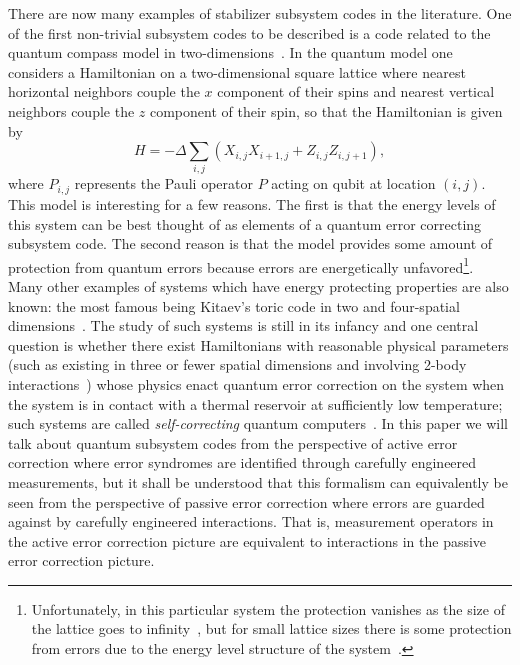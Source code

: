 \documentclass{amsbook}
\theoremstyle{plain}
\theoremstyle{definition}
\theoremstyle{remark}
\begin{document}
There are now many examples of stabilizer subsystem codes in the literature.  One of the first non-trivial subsystem codes to be described is a code related to the quantum compass model in two-dimensions~\cite{Bacon:01a,Dorier:05a,Bacon:06a}.  In the quantum model one considers a Hamiltonian on a two-dimensional square lattice where nearest horizontal neighbors couple the $x$ component of their spins and nearest vertical neighbors couple the $z$ component of their spin, so that the Hamiltonian is given by
\begin{equation}
H=-\Delta \sum_{i,j} (X_{i,j} X_{i+1,j} +Z_{i,j} Z_{i,j+1}),
\end{equation}
where $P_{i,j}$ represents the Pauli operator $P$ acting on qubit at location $(i,j)$.  This model is interesting for a few reasons.  The first is that the energy levels of this system can be best thought of as elements of a quantum error correcting subsystem code.  The second reason is that the model provides some amount of protection from quantum errors because errors are energetically unfavored\footnote{Unfortunately, in this particular system the protection vanishes as the size of the lattice goes to infinity~\cite{Dorier:05a}, but for small lattice sizes there is some protection from errors due to the energy level structure of the system~\cite{Bacon:01a}.}.  Many other examples of systems which have energy protecting properties are also known: the most famous being Kitaev's toric code in two and four-spatial dimensions~\cite{Kitaev:97c,Kitaev:03a,Dennis:02a}.  The study of such systems is still in its infancy and one central question is whether there exist Hamiltonians with reasonable physical parameters (such as existing in three or fewer spatial dimensions and involving 2-body interactions~\cite{Bravyi:09a,Bravyi:10b}) whose physics enact quantum error correction on the system when the system is in contact with a thermal reservoir at sufficiently low temperature; such systems are called \emph{self-correcting} quantum computers~\cite{Bacon:06a,Bombin:09a}.  In this paper we will talk about quantum subsystem codes from the perspective of active error correction where error syndromes are identified through carefully engineered measurements, but it shall be understood that this formalism can equivalently be seen from the perspective of passive error correction where errors are guarded against by carefully engineered interactions.  That is, measurement operators in the active error correction picture are equivalent to interactions in the passive error correction picture.
\end{document}
